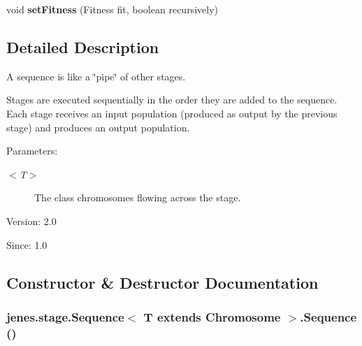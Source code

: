 \begin{CompactItemize}
\item 
\hypertarget{classjenes_1_1stage_1_1_sequence_3_01_t_01extends_01_chromosome_01_4_1ec43e74c2534861caf2475405869853}{
void \textbf{setFitness} (Fitness fit, boolean recursively)}
\label{classjenes_1_1stage_1_1_sequence_3_01_t_01extends_01_chromosome_01_4_1ec43e74c2534861caf2475405869853}

\end{CompactItemize}


\subsection{Detailed Description}
A sequence is like a \char`\"{}pipe\char`\"{} of other stages.\par
 Stages are executed sequentially in the order they are added to the sequence. Each stage receives an input population (produced as output by the previous stage) and produces an output population.

\begin{Desc}
\item[Parameters:]
\begin{description}
\item[{\em $<$T$>$}]The class chromosomes flowing across the stage.\end{description}
\end{Desc}
\begin{Desc}
\item[Version:]2.0 \end{Desc}
\begin{Desc}
\item[Since:]1.0 \end{Desc}


\subsection{Constructor \& Destructor Documentation}
\hypertarget{classjenes_1_1stage_1_1_sequence_3_01_t_01extends_01_chromosome_01_4_f6554137f4a770513d9cc8bf481e7d00}{
\subsubsection[Sequence]{\setlength{\rightskip}{0pt plus 5cm}jenes.stage.Sequence$<$ T extends Chromosome $>$.Sequence ()}}
\label{classjenes_1_1stage_1_1_sequence_3_01_t_01extends_01_chromosome_01_4_f6554137f4a770513d9cc8bf481e7d00}


